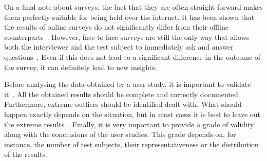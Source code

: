 On a final note about surveys, the fact that they are often straight-forward makes them perfectly suitable for being held over the internet. It has been shown that the results of online surveys do not significantly differ from their offline counterparts~\cite{komarov2013crowdsourcing}. However, face-to-face surveys are still the only way that allows both the interviewer and the test subject to immediately ask and answer questions~\cite{wohlin2003empirical}. Even if this does not lead to a significant difference in the outcome of the survey, it can definitely lead to new insights.

Before analysing the data obtained by a user study, it is important to validate it~\cite{wohlin2003empirical}. All the obtained results should be complete and correctly documented. Furthermore, extreme outliers should be identified dealt with. What should happen exactly depends on the situation, but in most cases it is best to leave out the extreme results~\cite{komarov2013crowdsourcing}. Finally, it is very important to provide a grade of validity along with the conclusions of the user studies. This grade depends on, for instance, the number of test subjects, their representativeness or the distribution of the results.
